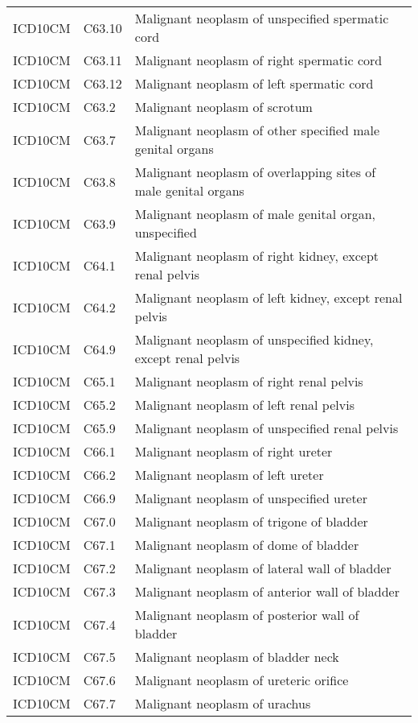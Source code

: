 \begin{longtable}{p{}p{}p{}}
  ICD10CM & C63.10 & Malignant neoplasm of unspecified spermatic cord \\ 
  ICD10CM & C63.11 & Malignant neoplasm of right spermatic cord \\ 
  ICD10CM & C63.12 & Malignant neoplasm of left spermatic cord \\ 
  ICD10CM & C63.2 & Malignant neoplasm of scrotum \\ 
  ICD10CM & C63.7 & Malignant neoplasm of other specified male genital organs \\ 
  ICD10CM & C63.8 & Malignant neoplasm of overlapping sites of male genital organs \\ 
  ICD10CM & C63.9 & Malignant neoplasm of male genital organ, unspecified \\ 
  ICD10CM & C64.1 & Malignant neoplasm of right kidney, except renal pelvis \\ 
  ICD10CM & C64.2 & Malignant neoplasm of left kidney, except renal pelvis \\ 
  ICD10CM & C64.9 & Malignant neoplasm of unspecified kidney, except renal pelvis \\ 
  ICD10CM & C65.1 & Malignant neoplasm of right renal pelvis \\ 
  ICD10CM & C65.2 & Malignant neoplasm of left renal pelvis \\ 
  ICD10CM & C65.9 & Malignant neoplasm of unspecified renal pelvis \\ 
  ICD10CM & C66.1 & Malignant neoplasm of right ureter \\ 
  ICD10CM & C66.2 & Malignant neoplasm of left ureter \\ 
  ICD10CM & C66.9 & Malignant neoplasm of unspecified ureter \\ 
  ICD10CM & C67.0 & Malignant neoplasm of trigone of bladder \\ 
  ICD10CM & C67.1 & Malignant neoplasm of dome of bladder \\ 
  ICD10CM & C67.2 & Malignant neoplasm of lateral wall of bladder \\ 
  ICD10CM & C67.3 & Malignant neoplasm of anterior wall of bladder \\ 
  ICD10CM & C67.4 & Malignant neoplasm of posterior wall of bladder \\ 
  ICD10CM & C67.5 & Malignant neoplasm of bladder neck \\ 
  ICD10CM & C67.6 & Malignant neoplasm of ureteric orifice \\ 
  ICD10CM & C67.7 & Malignant neoplasm of urachus \\ 

\end{longtable}
